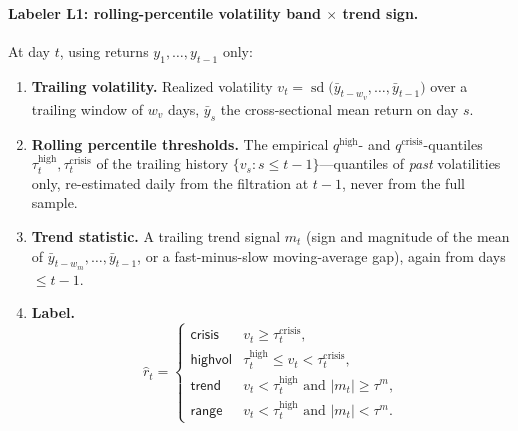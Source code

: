 \documentclass[11pt,a4paper]{article}
\theoremstyle{definition}
\theoremstyle{plain}
\begin{document}
\paragraph{Labeler L1: rolling-percentile volatility band $\times$ trend sign.}
At day $t$, using returns $y_1, \ldots, y_{t-1}$ only:
\begin{enumerate}
  \item \textbf{Trailing volatility.} Realized volatility
        $v_t = \operatorname{sd}\bigl(\bar y_{t-w_v}, \ldots, \bar y_{t-1}\bigr)$
        over a trailing window of $w_v$ days, $\bar y_s$ the cross-sectional
        mean return on day $s$.
  \item \textbf{Rolling percentile thresholds.} The empirical
        $q^{\text{high}}$- and $q^{\text{crisis}}$-quantiles
        $\tau^{\text{high}}_t, \tau^{\text{crisis}}_t$ of the trailing
        history $\{v_s : s \le t-1\}$---quantiles of \emph{past}
        volatilities only, re-estimated daily from the filtration at $t-1$,
        never from the full sample.
  \item \textbf{Trend statistic.} A trailing trend signal $m_t$ (sign and
        magnitude of the mean of $\bar y_{t-w_m}, \ldots, \bar y_{t-1}$, or
        a fast-minus-slow moving-average gap), again from days $\le t-1$.
  \item \textbf{Label.}
        \[
        \hat r_t =
        \begin{cases}
          \textsf{crisis} & v_t \ge \tau^{\text{crisis}}_t, \\
          \textsf{highvol} & \tau^{\text{high}}_t \le v_t < \tau^{\text{crisis}}_t, \\
          \textsf{trend} & v_t < \tau^{\text{high}}_t \text{ and } |m_t| \ge \tau^{m}, \\
          \textsf{range} & v_t < \tau^{\text{high}}_t \text{ and } |m_t| < \tau^{m}.
        \end{cases}
        \]
\end{enumerate}
\end{document}
